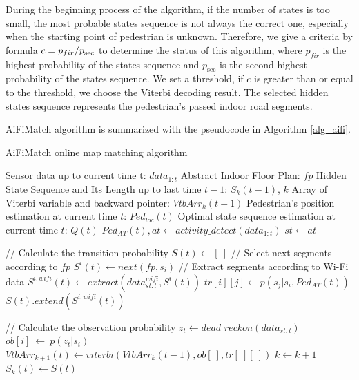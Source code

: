 \documentclass{llncs}
\begin{document}
During the beginning process of the algorithm, if the number of states is too small, the most probable states sequence is not always the correct one, especially when the starting point of pedestrian is unknown. Therefore, we give a criteria by formula $c = {{{p_{fir}}} \mathord{\left/
		{\vphantom {{{p_{fir}}} {{p_{\sec }}}}} \right.
		\kern-\nulldelimiterspace} {{p_{\sec }}}}$ to determine the status of this algorithm, where ${p_{fir}}$ is the highest probability of the states sequence and ${p_{\sec }}$ is the second highest probability of the states sequence. We set a threshold, if $c$ is greater than or equal to the threshold, we choose the Viterbi decoding result. The selected hidden states sequence represents the pedestrian's passed indoor road segments.

AiFiMatch algorithm is summarized with the pseudocode in Algorithm \ref{alg_aifi}.  

\begin{algorithm}[H]
	\caption{AiFiMatch online map matching algorithm}
	\label{alg_aifi}
	\begin{algorithmic}[1]
		\renewcommand{\algorithmicrequire}{\textbf{Input:}}
		\renewcommand{\algorithmicensure}{\textbf{Output:}}
		\REQUIRE Sensor data up to current time t: $data_{1:t}$
		\REQUIRE Abstract Indoor Floor Plan: $fp$
		\REQUIRE Hidden State Sequence and Its Length up to last time $t-1$: $S_{k}(t-1)$, $k$
		\REQUIRE Array of Viterbi variable and backward pointer: ${VtbArr}_{k}(t-1)$
		\ENSURE Pedestrian's position estimation at current time $t$: $Ped_{loc}(t)$
		\ENSURE Optimal state sequence estimation at current time $t$: $Q(t)$
		\STATE ${Ped_{AT}(t)}, at \leftarrow activity\_detect({data_{1:t}})$
		\STATE ${st} \leftarrow {at}$  
		
		\STATE // Calculate the transition probability
		\STATE $S(t) \leftarrow [\ ]$
		\STATE // Select next segments according to $fp$
		\STATE $S^{i}(t) \leftarrow next(fp,s_i)$
		\STATE // Extract segments according to Wi-Fi data
		\STATE $S^{i,wifi}(t) \leftarrow extract(data_{st:t}^{wifi},S^{i}(t))$
		\STATE $tr[i][j] \leftarrow p(s_j|s_i,{Ped_{AT}(t)})$
		\ENDFOR
		\STATE $S(t).extend(S^{i,wifi}(t))$
		\ENDFOR
		
		\STATE // Calculate the observation probability		    
		\STATE ${z_t} \leftarrow dead\_reckon(data_{st:t})$
		\STATE $ob[i]\ \leftarrow\ p(z_t|s_i)$
		\ENDFOR
		\STATE ${VtbArr}_{k+1}(t) \leftarrow viterbi({VtbArr}_{k}(t-1), ob[\ ], tr[\ ][\ ])$
		\STATE $k \leftarrow k+1$
		\STATE $S_{k}(t) \leftarrow S(t)$
		
				
	\end{algorithmic}
\end{algorithm}
\end{document}
